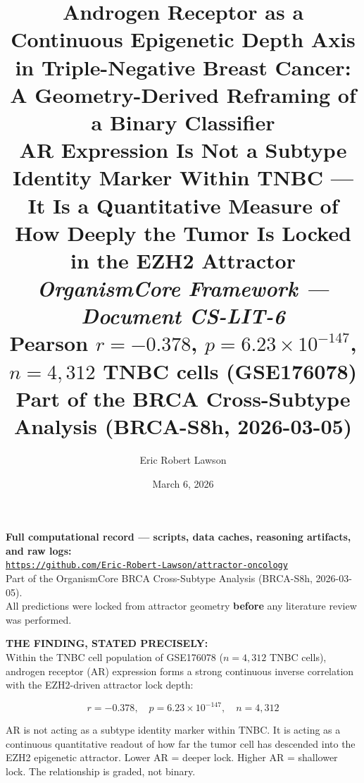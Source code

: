 \documentclass[12pt, a4paper]{article}
\title{
    \vspace{-1em}
    \textbf{Androgen Receptor as a Continuous
    Epigenetic Depth Axis in Triple-Negative
    Breast Cancer: A Geometry-Derived Reframing
    of a Binary Classifier}\\[0.5em]
    \large AR Expression Is Not a Subtype
    Identity Marker Within TNBC --- It Is a
    Quantitative Measure of How Deeply the
    Tumor Is Locked in the EZH2 Attractor\\[0.4em]
    \normalsize \textit{OrganismCore Framework ---
    Document CS-LIT-6}\\[0.3em]
    \small Pearson $r = -0.378$,
    $p = 6.23 \times 10^{-147}$,
    $n = 4{,}312$ TNBC cells (GSE176078)\\[0.3em]
    \small Part of the BRCA Cross-Subtype Analysis
    (BRCA-S8h, 2026-03-05)
}
\author[1]{Eric Robert Lawson}
\affil[1]{
    OrganismCore\\
    \href{mailto:OrganismCore@proton.me}
         {OrganismCore@proton.me}\\
    ORCID:
    \href{https://orcid.org/0009-0002-0414-6544}
         {0009-0002-0414-6544}
}
\date{March 6, 2026}
\begin{document}

\maketitle
\thispagestyle{fancy}

\begin{center}
\colorbox{repobox}{
\begin{minipage}{0.88\textwidth}
\vspace{0.5em}
\centering
\textbf{Full computational record --- scripts, data
caches, reasoning artifacts, and raw logs:}\\[0.4em]
\href{https://github.com/Eric-Robert-Lawson/attractor-oncology}
{\texttt{https://github.com/Eric-Robert-Lawson/attractor-oncology}}
\\[0.3em]
\small Part of the OrganismCore BRCA Cross-Subtype
Analysis (BRCA-S8h, 2026-03-05).\\
All predictions were locked from attractor geometry
\textbf{before} any literature review was performed.
\vspace{0.5em}
\end{minipage}}
\end{center}

\vspace{1em}

\begin{center}
\colorbox{findingbox}{
\begin{minipage}{0.88\textwidth}
\vspace{0.5em}
\textbf{THE FINDING, STATED PRECISELY:}\\[0.4em]
Within the TNBC cell population of GSE176078
($n = 4{,}312$ TNBC cells), androgen receptor
(AR) expression forms a strong continuous
inverse correlation with the EZH2-driven
attractor lock depth:

\[
r = -0.378,\quad
p = 6.23 \times 10^{-147},\quad
n = 4{,}312
\]

AR is not acting as a subtype identity marker
within TNBC. It is acting as a continuous
quantitative readout of how far the tumor cell
has descended into the EZH2 epigenetic attractor.
Lower AR = deeper lock. Higher AR = shallower
lock. The relationship is graded, not binary.
\vspace{0.5em}
\end{minipage}}
\end{center}
\end{document}
